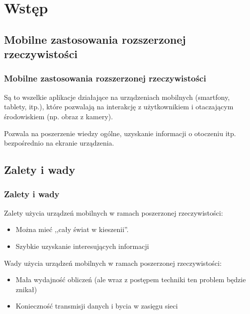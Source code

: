 \section{Wstęp}
\nextoc 

\subsection{Mobilne zastosowania rozszerzonej rzeczywistości}
\begin{frame}
    \frametitle{Mobilne zastosowania rozszerzonej rzeczywistości}

    Są to wszelkie aplikacje działające na urządzeniach mobilnych (smartfony, tablety, itp.), które pozwalają na interakcję z użytkownikiem i otaczającym środowiskiem (np. obraz z kamery).

    Pozwala na poszerzenie wiedzy ogólne, uzyskanie informacji o otoczeniu itp. bezpośrednio na ekranie urządzenia.
\end{frame}

\subsection{Zalety i wady}
\begin{frame}
    \frametitle{Zalety i wady}
    Zalety użycia urządzeń mobilnych w ramach poszerzonej rzeczywistości:
    \begin{itemize}
        \item Można mieć ,,cały świat w kieszenii''.
        \item Szybkie uzyskanie interesujących informacji
    \end{itemize}
    Wady użycia urządzeń mobilnych w ramach poszerzonej rzeczywistości:
    \begin{itemize}
        \item Mała wydajność obliczeń (ale wraz z postępem techniki ten problem będzie znikał)
        \item Konieczność transmisji danych i bycia w zasięgu sieci
    \end{itemize}
\end{frame}


